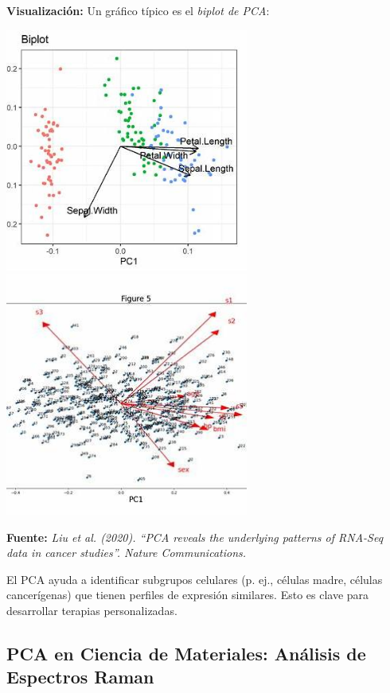 \documentclass[12pt]{article}
\begin{document}
\vspace{1em}
\noindent
\textbf{Visualización:} Un gráfico típico es el \emph{biplot de PCA}:

\begin{center}
	\includegraphics[width=0.6\textwidth]{imagenes/pca_biplot_genomics.png}
	\includegraphics[width=0.6\textwidth]{imagenes/pca_biplot_genomics1.png}
\end{center}

\noindent
\textbf{Fuente:} \emph{Liu et al. (2020). ``PCA reveals the underlying patterns of RNA-Seq data in cancer studies''. Nature Communications.}

\vspace{1em}
\noindent
El PCA ayuda a identificar subgrupos celulares (p. ej., células madre, células cancerígenas) que tienen perfiles de expresión similares. Esto es clave para desarrollar terapias personalizadas.

\subsection*{PCA en Ciencia de Materiales: Análisis de Espectros Raman}
\end{document}
